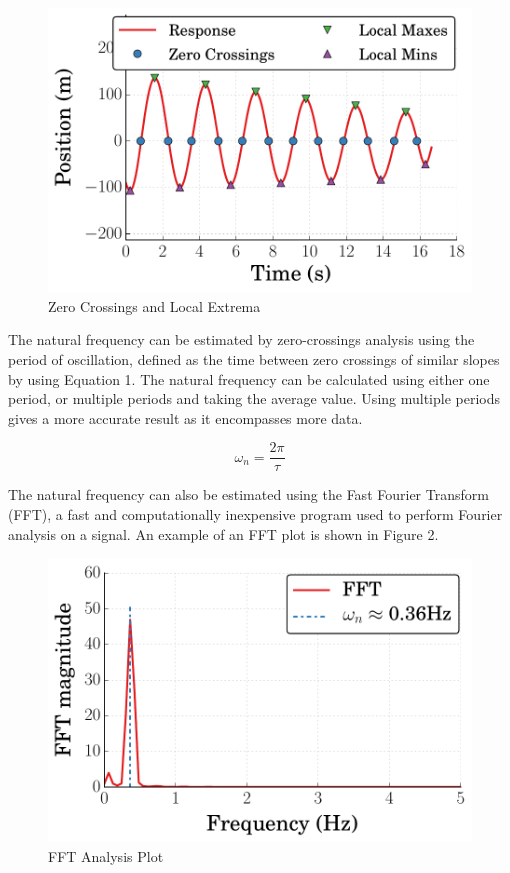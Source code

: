 \documentclass[11pt]{article}
\begin{document}
\begin{figure}[htbp] %
   \centering
   \includegraphics[width=4.5in]{zeroCrossings_and_extrema.pdf} 
   \caption{Zero Crossings and Local Extrema}
   \label{fig:example}
\end{figure}

\bigskip

The natural frequency can be estimated by zero-crossings analysis using the period of oscillation, defined as the time between zero crossings of similar slopes by using Equation 1. The natural frequency can be calculated using either one period, or multiple periods and taking the average value. Using multiple periods gives a more accurate result as it encompasses more data. 
\bigskip


\begin{equation}
\omega_{n} = \frac{2\pi}{\tau}
\label{eqn:example}
\end{equation}

\bigskip

The natural frequency can also be estimated using the Fast Fourier Transform (FFT), a fast and computationally inexpensive program used to perform Fourier analysis on a signal. An example of an FFT plot is shown in Figure 2.
\bigskip

\begin{figure}[htbp] %
   \centering
   \includegraphics[width=4.5in]{FFT_magnitude.pdf} 
   \caption{FFT Analysis Plot}
   \label{fig:example}
\end{figure}
\end{document}
